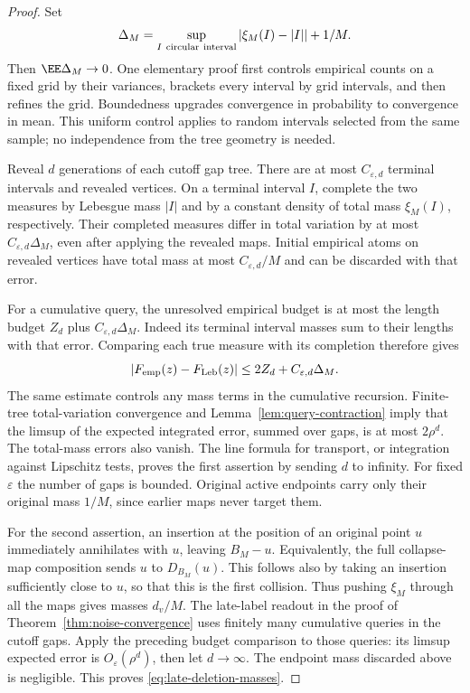 \documentclass[11pt,letterpaper]{article}
\begin{document}
\begin{proof}
Set
\[
 \Delta_M=\sup_{I\ {\rm circular\ interval}}
                  |\xi_M(I)-|I||+1/M.
\]
Then $\EE\Delta_M\to0$. One elementary proof first controls empirical
counts on a fixed grid by their variances, brackets every interval
by grid intervals, and then refines the grid. Boundedness upgrades
convergence in probability to convergence in mean. This uniform
control applies to random intervals selected from the same sample;
no independence from the tree geometry is needed.

Reveal $d$ generations of each cutoff gap tree. There are at most
$C_{\varepsilon,d}$ terminal intervals and revealed vertices.
On a terminal interval $I$, complete the two measures by Lebesgue
mass $|I|$ and by a constant density of total mass $\xi_M(I)$,
respectively. Their completed measures differ in total variation
by at most $C_{\varepsilon,d}\Delta_M$, even after applying the
revealed maps. Initial empirical atoms on revealed vertices have total mass at most
$C_{\varepsilon,d}/M$ and can be discarded with that error.

For a cumulative query, the unresolved empirical budget is at most
the length budget $Z_d$ plus $C_{\varepsilon,d}\Delta_M$.
Indeed its terminal interval masses sum to their lengths with that
error. Comparing each true measure with its completion therefore gives
\[
 |F_{\rm emp}(z)-F_{\rm Leb}(z)|
       \le2Z_d+C_{\varepsilon,d}\Delta_M.
\]
The same estimate controls any mass terms in the cumulative recursion.
Finite-tree total-variation convergence and
Lemma~\ref{lem:query-contraction} imply that the limsup of the expected
integrated error, summed over gaps, is at most $2\rho^d$.
The total-mass errors also vanish. The line formula for transport,
or integration against Lipschitz tests, proves the first assertion
by sending $d$ to infinity. For fixed $\varepsilon$ the number of
gaps is bounded. Original active endpoints carry only their original
mass $1/M$, since earlier maps never target them.

For the second assertion, an insertion at the position of an
original point $u$ immediately annihilates with $u$, leaving
$B_M-u$. Equivalently, the full collapse-map composition sends $u$
to $D_{B_M}(u)$. This follows also by taking an insertion sufficiently
close to $u$, so that this is the first collision.
Thus pushing $\xi_M$ through all the maps gives masses $d_v/M$.
The late-label readout in the proof of
Theorem~\ref{thm:noise-convergence} uses finitely many cumulative
queries in the cutoff gaps. Apply the preceding budget comparison
to those queries: its limsup expected error is
$O_\varepsilon(\rho^d)$, then let $d\to\infty$.
The endpoint mass discarded above is negligible. This proves
\eqref{eq:late-deletion-masses}.
\end{proof}
\end{document}

